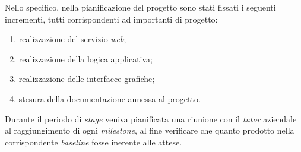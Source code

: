 Nello specifico, nella pianificazione del progetto sono stati fissati i seguenti incrementi, tutti corrispondenti ad importanti  di progetto:
\begin{enumerate}
	\item realizzazione del servizio \textit{web};
	\item realizzazione della logica applicativa;
	\item realizzazione delle interfacce grafiche;
	\item stesura della documentazione annessa al progetto.
\end{enumerate}

Durante il periodo di \textit{stage} veniva pianificata una riunione con il \textit{tutor} aziendale al raggiungimento di ogni \textit{milestone}, al fine verificare che quanto prodotto nella corrispondente \textit{baseline} fosse inerente alle attese.